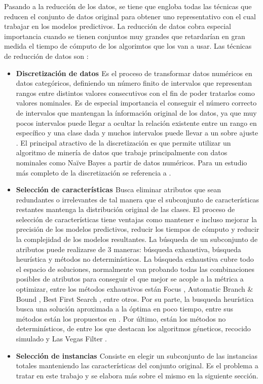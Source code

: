 Pasando a la reducción de los datos, se tiene que engloba todas las técnicas que reducen el conjunto de datos original para obtener uno representativo con el cual trabajar en los modelos predictivos. La reducción de datos cobra especial importancia cuando se tienen conjuntos muy grandes que retardarían en gran medida el tiempo de cómputo de los algorimtos que los van a usar. Las técnicas de reducción de datos son \cite{garcia2016data}:

\begin{itemize}
\item \textbf{Discretización de datos \cite{garcia2016data,garcia2013survey}}
Es el proceso de transformar datos numéricos en datos categóricos, definiendo un número finito de intervalos que representan rangos entre distintos valores consecutivos con el fin de poder tratarlos como valores nominales. Es de especial importancia el conseguir el número correcto de intervalos que mantengan la ínformación original de los datos, ya que muy pocos intervalos puede llegar a ocultar la relación existente entre un rango en específico y una clase dada y muchos intervalos puede llevar a un sobre ajuste \cite{cios2007data}. El principal atractivo de la discretización es que permite utilizar un algoritmo de minería de datos que trabaje principalmente con datos nominales como Naïve Bayes \cite{yang2009discretization} a partir de datos numéricos. Para un estudio más completo de la discretización se referencia a \cite{garcia2013survey}.

\item \textbf{Selección de características \cite{garcia2016data,liu2012feature}}
Busca eliminar atributos que sean redundantes o irrelevantes de tal manera que el subconjunto de características restantes mantenga la distribución original de las clases. El proceso de selección de características tiene ventajas como mantener e incluso mejorar la precisión de los modelos predictivos, reducir los tiempos de cómputo y reducir la complejidad de los modelos resultantes. La búsqueda de un subconjunto de atributos puede realizarse de 3 maneras: búsqueda exhaustiva, búsqueda heurística y métodos no determinísticos. La búsqueda exhaustiva cubre todo el espacio de soluciones, normalmente van probando todas las combinaciones posibles de atributos para conseguir el que mejor se acople a la métrica a optimizar, entre los métodos exhaustivos están Focus \cite{almuallim1991learning}, Automatic Branch \& Bound \cite{liul1998monotonic}, Best First Search \cite{xu1988best}, entre otros. Por su parte, la busqueda heurística busca una solución aproximada a la óptima en poco tiempo, entre sus métodos están los propuestos en \cite{dash1997feature,koller1996toward,battiti1994using}. Por último, están los métodos no determinísticos, de entre los que destacan los algoritmos géneticos, recocido simulado y Las Vegas Filter \cite{liu1996probabilistic}.

\item \textbf{Selección de instancias \cite{garcia2016data}}
Consiste en elegir un subconjunto de las instancias totales manteniendo las características del conjunto original. Es el problema a tratar en este trabajo y se elabora más sobre el mismo en la siguiente sección.
\end{itemize}

